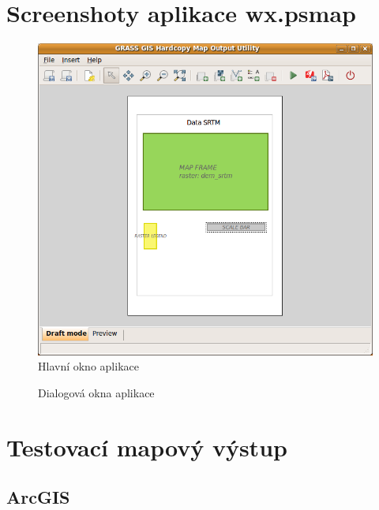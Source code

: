 \documentclass[a4paper,12pt,draft]{article}
\newif\ifbc %
\begin{document}
\section{Screenshoty aplikace wx.psmap}
\label{priloha:screenshot:psmap}
\begin{figure}[h!]
  \centering
  \includegraphics[height=0.4\textheight]{./GUI_screenshots/psmap_main.png}
  \caption{Hlavní okno aplikace}
  \label{fig:main}
\end{figure}
\begin{figure}[h!]
\centering
{}
\quad
{}
\caption{Dialogová okna aplikace\label{fig:dialogy}}
\end{figure}

\newpage
\ifbc
\section{Testovací mapový výstup}
\label{priloha:vystupy}
\subsection{ArcGIS}
\label{priloha:vystupy:arcgis}
\end{document}
